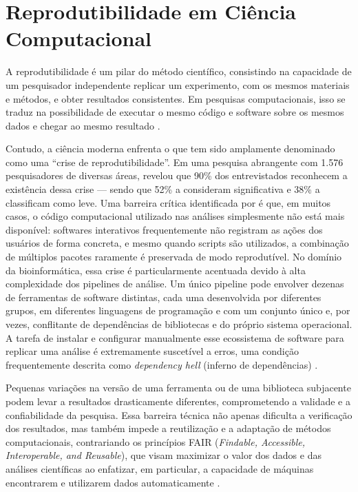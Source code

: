 \section{Reprodutibilidade em Ciência Computacional}

A reprodutibilidade é um pilar do método científico, consistindo na capacidade de um pesquisador independente replicar um experimento, com os mesmos materiais e métodos, e obter resultados consistentes. Em pesquisas computacionais, isso se traduz na possibilidade de executar o mesmo código e software sobre os mesmos dados e chegar ao mesmo resultado \cite{peng2011,sandve2013}.

Contudo, a ciência moderna enfrenta o que tem sido amplamente denominado como uma ``crise de reprodutibilidade''. Em uma pesquisa abrangente com 1.576 pesquisadores de diversas áreas,  revelou que 90\% dos entrevistados reconhecem a existência dessa crise --- sendo que 52\% a consideram significativa e 38\% a classificam como leve. Uma barreira crítica identificada por  é que, em muitos casos, o código computacional utilizado nas análises simplesmente não está mais disponível: softwares interativos frequentemente não registram as ações dos usuários de forma concreta, e mesmo quando scripts são utilizados, a combinação de múltiplos pacotes raramente é preservada de modo reprodutível. No domínio da bioinformática, essa crise é particularmente acentuada devido à alta complexidade dos pipelines de análise. Um único pipeline pode envolver dezenas de ferramentas de software distintas, cada uma desenvolvida por diferentes grupos, em diferentes linguagens de programação e com um conjunto único e, por vezes, conflitante de dependências de bibliotecas e do próprio sistema operacional. A tarefa de instalar e configurar manualmente esse ecossistema de software para replicar uma análise é extremamente suscetível a erros, uma condição frequentemente descrita como \textit{dependency hell} (inferno de dependências) \cite{gruning2018}.

Pequenas variações na versão de uma ferramenta ou de uma biblioteca subjacente podem levar a resultados drasticamente diferentes, comprometendo a validade e a confiabilidade da pesquisa. Essa barreira técnica não apenas dificulta a verificação dos resultados, mas também impede a reutilização e a adaptação de métodos computacionais, contrariando os princípios FAIR (\textit{Findable, Accessible, Interoperable, and Reusable}), que visam maximizar o valor dos dados e das análises científicas ao enfatizar, em particular, a capacidade de máquinas encontrarem e utilizarem dados automaticamente \cite{sandve2013,wilkinson2016,gruning2018,bes2017}.

